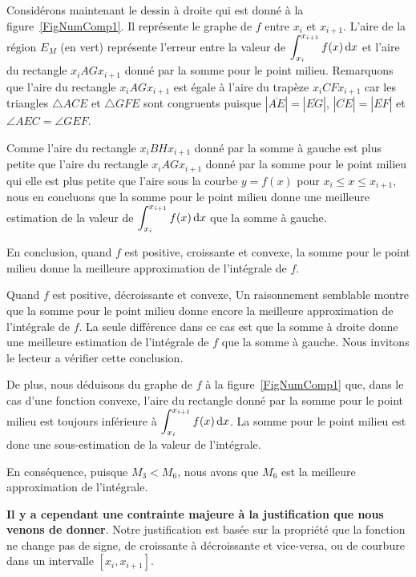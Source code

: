 {\begin{egg}
Considérons maintenant le dessin à droite qui est donné à la
figure~\ref{FigNumComp1}.  Il représente le graphe de $f$ entre $x_i$
et $x_{i+1}$.  L'aire de la région $E_M$ (en vert) représente l'erreur
entre la valeur de $\displaystyle \int_{x_i}^{x_{i+1}} f(x) \,\mathrm{d}x$ et
l'aire du rectangle \mbox{\rectangle$x_iAGx_{i+1}$} donné par la somme
pour le point milieu.  Remarquons que l'aire du rectangle
\mbox{\rectangle$x_iAGx_{i+1}$} est égale à l'aire du trapèze
\mbox{\trapeze$x_iCFx_{i+1}$} car les triangles $\triangle ACE$ et
$\triangle GFE$ sont congruents puisque
$|\overline{AE}| = |\overline{EG}|$, $|\overline{CE}| =
|\overline{EF}|$ et $\angle AEC = \angle GEF$.

Comme l'aire du rectangle \mbox{\rectangle$x_iBHx_{i+1}$}
donné par la somme à gauche est plus petite que l'aire du rectangle
\mbox{\rectangle$x_iAGx_{i+1}$} donné par la somme pour le point
milieu qui elle est plus petite que l'aire sous la courbe
$y=f(x)$ pour $x_i \leq x \leq x_{i+1}$, nous en concluons que la somme
pour le point milieu donne une meilleure estimation de la valeur de
$\displaystyle \int_{x_i}^{x_{i+1}} f(x) \,\mathrm{d}x$ que la somme à gauche.

En conclusion, quand $f$ est positive, croissante et convexe, la somme
pour le point milieu donne la meilleure approximation de l'intégrale
de $f$.

Quand $f$ est positive, décroissante et convexe, Un raisonnement
semblable montre que la somme pour le point milieu donne encore la
meilleure approximation de l'intégrale de $f$.  La seule différence
dans ce cas est que la somme à droite donne une meilleure estimation
de l'intégrale de $f$ que la somme à gauche.  Nous invitons le lecteur a
vérifier cette conclusion.

De plus, nous déduisons du graphe de $f$ à la figure~\ref{FigNumComp1}
que, dans le cas d'une fonction convexe, l'aire du rectangle donné par
la somme pour le point milieu est toujours inférieure à
$\displaystyle \int_{x_i}^{x_{i+1}} f(x) \,\mathrm{d}x$.  La somme pour
le point milieu est donc une sous-estimation de la valeur de l'intégrale.

En conséquence, puisque $M_3 < M_6$, nous avons que $M_6$ est la meilleure
approximation de l'intégrale.

{\bfseries Il y a cependant une contrainte majeure à la justification
que nous venons de donner}.  Notre justification est basée sur la
propriété que la fonction ne change pas de signe, de croissante à
décroissante et vice-versa, ou de courbure dans un intervalle
$[x_i,x_{i+1}]$.
\label{EGNumComp1}
\end{egg}

}
